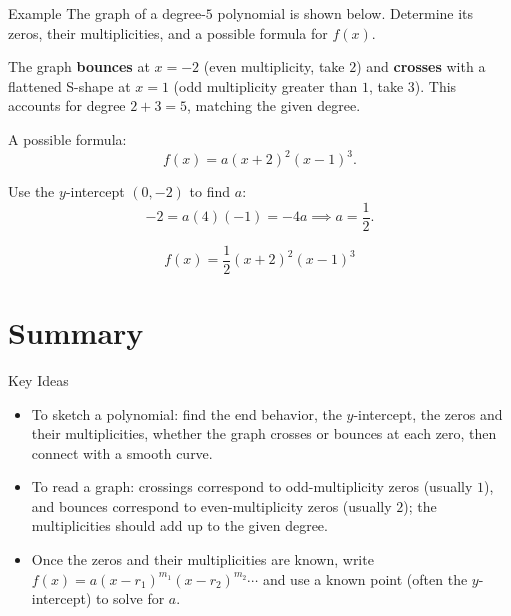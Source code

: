 \documentclass[12pt]{article}
\newcounter{examplenum}
\newenvironment{friendlyex}{%
    \refstepcounter{examplenum}%
    \begin{friendlyexbox}{Example \theexamplenum}%
}{%
    \end{friendlyexbox}%
}
\begin{document}
\begin{friendlyex}{}
The graph of a degree-$5$ polynomial is shown below. Determine its zeros, their multiplicities, and a possible formula for $f(x)$.

\begin{center}
\end{center}
\end{friendlyex}

\begin{solutionbox}
The graph \textbf{bounces} at $x=-2$ (even multiplicity, take $2$) and \textbf{crosses} with a flattened S-shape at $x=1$ (odd multiplicity greater than $1$, take $3$). This accounts for degree $2+3=5$, matching the given degree.

A possible formula:
\[
f(x)=a(x+2)^2(x-1)^3.
\]

Use the $y$-intercept $(0,-2)$ to find $a$:
\[
-2=a(4)(-1)=-4a \implies a=\frac12.
\]

\[
\boxed{f(x)=\frac12(x+2)^2(x-1)^3}
\]
\end{solutionbox}

\section*{Summary}

\begin{friendlyrule}{Key Ideas}
\begin{itemize}
    \item To sketch a polynomial: find the end behavior, the $y$-intercept, the zeros and their multiplicities, whether the graph crosses or bounces at each zero, then connect with a smooth curve.
    \item To read a graph: crossings correspond to odd-multiplicity zeros (usually $1$), and bounces correspond to even-multiplicity zeros (usually $2$); the multiplicities should add up to the given degree.
    \item Once the zeros and their multiplicities are known, write $f(x)=a(x-r_1)^{m_1}(x-r_2)^{m_2}\cdots$ and use a known point (often the $y$-intercept) to solve for $a$.
\end{itemize}
\end{friendlyrule}
\end{document}
